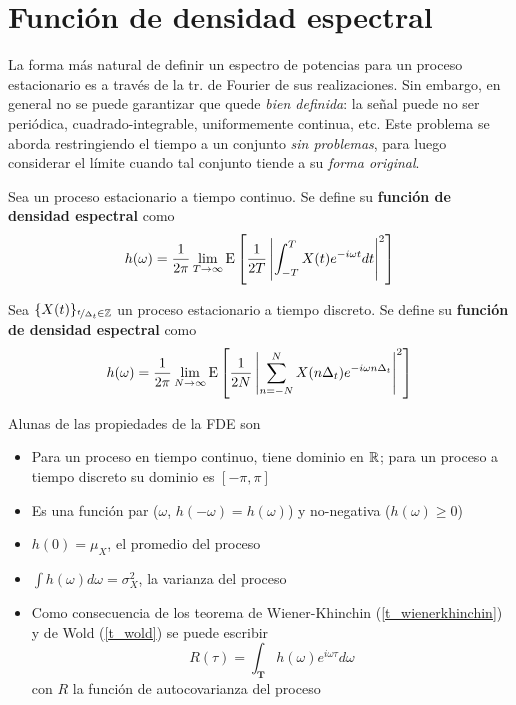 \section{Función de densidad espectral}

La forma más natural de definir un espectro de potencias para un proceso estacionario 
es a través de la tr. de Fourier de sus realizaciones. Sin embargo, en general no se puede 
garantizar que quede \textit{bien definida}: la señal puede no ser periódica, 
cuadrado-integrable, uniformemente continua, etc.
%
Este problema se aborda restringiendo el tiempo a un conjunto \textit{sin problemas}, para luego
considerar el límite cuando tal conjunto tiende a su \textit{forma original}.

\begin{definicion}%
Sea \xt un proceso estacionario a tiempo continuo. Se define su \textbf{función de densidad 
espectral} como
\begin{equation}
h(\omega) = \frac{1}{2 \pi} \lim_{T\rightarrow \infty} \mathrm{E}\left[  \frac{1}{2T} 
\left|  \int_{-T}^{T} X(t) e^{-i \omega t} dt \right|^{2}  \right]
\label{txt_FDE_cont}
\end{equation}
\end{definicion}

\begin{definicion}%
Sea $\{X(t)\}_{\nicefrac{t}{\Delta_t}\in \mathbb{Z}}$ un proceso estacionario a tiempo discreto. Se 
define su \textbf{función de densidad espectral} como
\begin{equation}
h(\omega) = \frac{1}{2 \pi} \lim_{N\rightarrow \infty} \mathrm{E}\left[  \frac{1}{2N} 
\left|  \sum_{n=-N}^{N} X(n \Delta_t) e^{-i \omega n \Delta_t} \right|^{2}  \right]
\label{txt_FDE_disc}
\end{equation}
\end{definicion}

Alunas de las propiedades de la FDE son
\begin{itemize}
\item Para un proceso en tiempo continuo, tiene dominio en $\mathbb{R}$; para un proceso a tiempo discreto 
su dominio es $[-\pi,\pi]$
\item Es una función par ($\omega$, $h(-\omega) = h(\omega)$) y no-negativa ($h(\omega) \geq 0$)
\item $h(0) = \mu_X$, el promedio del proceso
\item $\int h(\omega) d\omega = \sigma^{2}_X$, la varianza del proceso %
\item Como consecuencia de los teorema de Wiener-Khinchin (\ref{t_wienerkhinchin}) y de Wold
(\ref{t_wold}) se puede escribir
\begin{equation}
R(\tau) = \int_{\boldsymbol{T}} h(\omega) e^{i \omega \tau} d\omega
\label{txt_r_ft_h}
\end{equation}
con $R$ la función de autocovarianza del proceso
\end{itemize}

